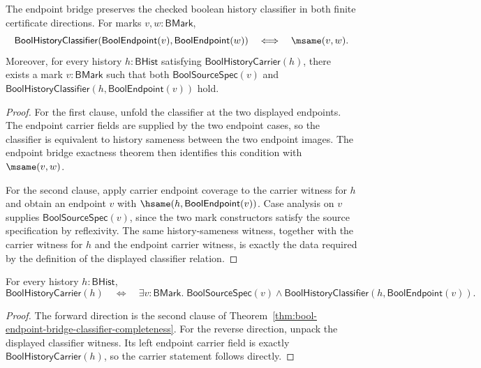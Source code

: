 \begin{theorem}
\label{thm:bool-endpoint-bridge-classifier-completeness}
The endpoint bridge preserves the checked boolean history classifier in both finite certificate directions. For marks $v,w:\mathsf{BMark}$,
$$
  \mathsf{BoolHistoryClassifier}(\mathsf{BoolEndpoint}(v),\mathsf{BoolEndpoint}(w))
  \quad\Longleftrightarrow\quad
  \msame(v,w).
$$
Moreover, for every history $h:\mathsf{BHist}$ satisfying $\mathsf{BoolHistoryCarrier}(h)$, there exists a mark $v:\mathsf{BMark}$ such that both $\mathsf{BoolSourceSpec}(v)$ and $\mathsf{BoolHistoryClassifier}(h,\mathsf{BoolEndpoint}(v))$ hold.
\end{theorem}
\begin{proof}
For the first clause, unfold the classifier at the two displayed endpoints. The endpoint carrier fields are supplied by the two endpoint cases, so the classifier is equivalent to history sameness between the two endpoint images. The endpoint bridge exactness theorem then identifies this condition with $\msame(v,w)$.

For the second clause, apply carrier endpoint coverage to the carrier witness for $h$ and obtain an endpoint $v$ with $\hsame(h,\mathsf{BoolEndpoint}(v))$. Case analysis on $v$ supplies $\mathsf{BoolSourceSpec}(v)$, since the two mark constructors satisfy the source specification by reflexivity. The same history-sameness witness, together with the carrier witness for $h$ and the endpoint carrier witness, is exactly the data required by the definition of the displayed classifier relation.
\end{proof}

\begin{theorem}
\label{thm:bool-carrier-classifier-endpoint-exactness}
For every history $h:\mathsf{BHist}$,
$$
  \mathsf{BoolHistoryCarrier}(h)
  \quad\Longleftrightarrow\quad
  \exists v:\mathsf{BMark}.\;
    \mathsf{BoolSourceSpec}(v)\land
    \mathsf{BoolHistoryClassifier}(h,\mathsf{BoolEndpoint}(v)).
$$
\end{theorem}
\begin{proof}
The forward direction is the second clause of
Theorem~\ref{thm:bool-endpoint-bridge-classifier-completeness}. For the reverse
direction, unpack the displayed classifier witness. Its left endpoint carrier
field is exactly $\mathsf{BoolHistoryCarrier}(h)$, so the carrier statement
follows directly.
\end{proof}

